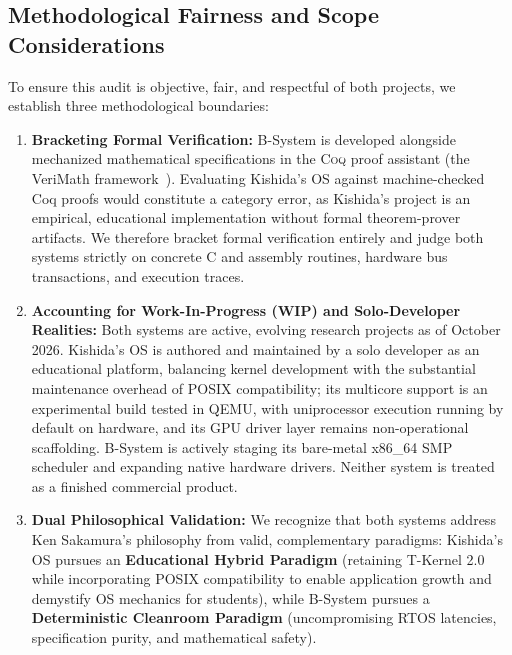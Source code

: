 \documentclass[10pt,journal,compsoc,twocolumn]{article}
\begin{document}
\subsection{Methodological Fairness and Scope Considerations}
To ensure this audit is objective, fair, and respectful of both projects, we establish three methodological boundaries:
\begin{enumerate}[leftmargin=*]
    \item \textbf{Bracketing Formal Verification:} B-System is developed alongside mechanized mathematical specifications in the \textsc{Coq} proof assistant (the VeriMath framework~\cite{sokhatsky2026verimath}). Evaluating Kishida's OS against machine-checked Coq proofs would constitute a category error, as Kishida's project is an empirical, educational implementation without formal theorem-prover artifacts. We therefore bracket formal verification entirely and judge both systems strictly on concrete C and assembly routines, hardware bus transactions, and execution traces.
    \item \textbf{Accounting for Work-In-Progress (WIP) and Solo-Developer Realities:} Both systems are active, evolving research projects as of October 2026. Kishida's OS is authored and maintained by a solo developer as an educational platform, balancing kernel development with the substantial maintenance overhead of POSIX compatibility; its multicore support is an experimental build tested in QEMU, with uniprocessor execution running by default on hardware, and its GPU driver layer remains non-operational scaffolding. B-System is actively staging its bare-metal x86\_64 SMP scheduler and expanding native hardware drivers. Neither system is treated as a finished commercial product.
    \item \textbf{Dual Philosophical Validation:} We recognize that both systems address Ken Sakamura's philosophy from valid, complementary paradigms: Kishida's OS pursues an \textbf{Educational Hybrid Paradigm} (retaining T-Kernel 2.0 while incorporating POSIX compatibility to enable application growth and demystify OS mechanics for students), while B-System pursues a \textbf{Deterministic Cleanroom Paradigm} (uncompromising RTOS latencies, specification purity, and mathematical safety).
\end{enumerate}
\end{document}
